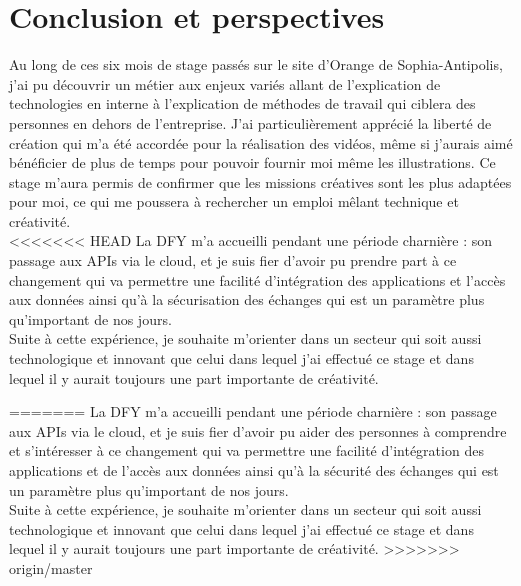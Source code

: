 \chapter*{Conclusion et perspectives}
\label{sec:conclusion}

Au long de ces six mois de stage passés sur le site d'Orange de Sophia-Antipolis, j'ai pu découvrir un métier aux enjeux variés allant de l'explication de technologies en interne à 
l'explication de méthodes de travail qui ciblera des personnes en dehors de l'entreprise. 
J'ai particulièrement apprécié la liberté de création qui m'a été accordée pour la réalisation des vidéos, même si j'aurais aimé bénéficier de plus de temps pour pouvoir fournir moi même les illustrations. Ce stage m'aura permis de confirmer que les missions créatives sont les plus adaptées pour moi, ce qui me poussera à rechercher un emploi mêlant technique et créativité.\\

<<<<<<< HEAD
La DFY m’a accueilli pendant une période charnière : son passage aux APIs via le cloud, et je suis fier d’avoir pu prendre part à ce changement qui va permettre une facilité d'intégration des applications et l'accès aux données ainsi qu'à la sécurisation des échanges qui est un paramètre plus qu'important de nos jours.\\

Suite à cette expérience, je souhaite m'orienter dans un secteur qui soit aussi technologique et innovant que celui dans lequel j'ai effectué ce stage et dans lequel il y aurait toujours une part importante de créativité.

=======
La DFY m’a accueilli pendant une période charnière : son passage aux APIs via le cloud, et je suis fier d’avoir pu aider des personnes à comprendre et s'intéresser à ce changement qui va permettre une facilité d'intégration des applications et de l'accès aux données ainsi qu'à la sécurité des échanges qui est un paramètre plus qu'important de nos jours.\\

Suite à cette expérience, je souhaite m'orienter dans un secteur qui soit aussi technologique et innovant que celui dans lequel j'ai effectué ce stage et dans lequel il y aurait toujours une part importante de créativité.
>>>>>>> origin/master


